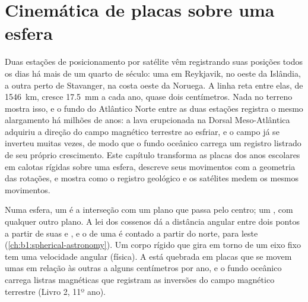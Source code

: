 \chapter{Cinemática de placas sobre uma esfera}\label{ch:b1:plate-kinematics}

Duas estações de posicionamento por satélite vêm registrando suas posições todos os dias há mais de um quarto de século: uma em Reykjavik, no oeste da Islândia, a outra perto de Stavanger, na costa oeste da Noruega. A linha reta entre elas, de \qty{1546}{km}, cresce \qty{17.5}{mm} a cada ano, quase dois centímetros. Nada no terreno mostra isso, e o fundo do Atlântico Norte entre as duas estações registra o mesmo alargamento há milhões de anos: a lava erupcionada na Dorsal Meso-Atlântica adquiriu a direção do campo magnético terrestre ao esfriar, e o campo já se inverteu muitas vezes, de modo que o fundo oceânico carrega um registro listrado de seu próprio crescimento. Este capítulo transforma as placas dos anos escolares em calotas rígidas sobre uma esfera, descreve seus movimentos com a geometria das rotações, e mostra como o registro geológico e os satélites medem os mesmos movimentos.

\begin{recall}
Numa esfera, um  é a interseção com um plano que passa pelo centro; um , com qualquer outro plano. A lei dos cossenos dá a distância angular entre dois pontos a partir de suas  e , e o  de uma  é contado a partir do norte, para leste
(\cref{ch:b1:spherical-astronomy}). Um corpo rígido que gira em torno de um eixo fixo tem uma velocidade angular (física). A  está quebrada em placas que se movem umas em relação às outras a alguns centímetros por ano, e o fundo oceânico
carrega listras magnéticas que registram as inversões do campo magnético terrestre (Livro 2, 11º ano).
\end{recall}

